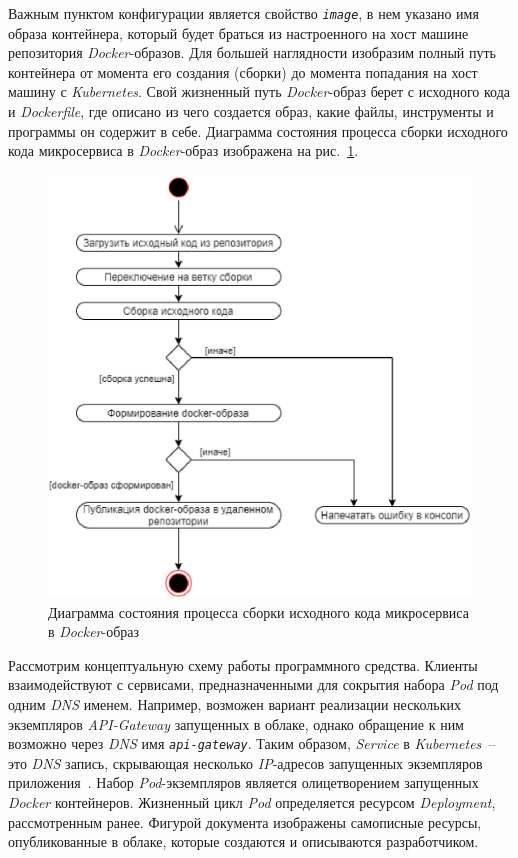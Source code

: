 Важным пунктом конфигурации является свойство \textit{\lstinline!image!}, в нем указано имя образа контейнера, который будет браться из настроенного на хост машине репозитория \textit{Docker}-образов. Для большей наглядности изобразим полный путь контейнера от момента его создания (сборки) до момента попадания на хост машину с \textit{Kubernetes}. Свой жизненный путь \textit{Docker}-образ берет с исходного кода и \textit{Dockerfile}, где описано из чего создается образ, какие файлы, инструменты и программы он содержит в себе. Диаграмма состояния процесса сборки исходного кода микросервиса в \textit{Docker}-образ изображена на рис.~\ref{fig:docker-image-flow}.

\begin{figure}[h]
\centering
    \includegraphics[width=0.75\linewidth]{assets/docker-image-flow.png}
    \caption{Диаграмма состояния процесса сборки исходного кода микросервиса в \textit{Docker}-образ}
    \label{fig:docker-image-flow}
\end{figure}

Рассмотрим концептуальную схему работы программного средства. Клиенты взаимодействуют с сервисами, предназначенными для сокрытия набора \textit{Pod} под одним \textit{DNS} именем. Например, возможен вариант реализации нескольких экземпляров \textit{API-Gateway} запущенных в облаке, однако обращение к ним возможно через \textit{DNS} имя \textit{\lstinline!api-gateway!}. Таким образом, \textit{Service} в \textit{Kubernetes}~-- это \textit{DNS} запись, скрывающая несколько \textit{IP}-адресов запущенных экземпляров приложения~\cite{book_production_kubernetes}. Набор \textit{Pod}-экземпляров является олицетворением запущенных \textit{Docker} контейнеров. Жизненный цикл \textit{Pod} определяется ресурсом \textit{Deployment}, рассмотренным ранее. Фигурой документа изображены самописные ресурсы, опубликованные в облаке, которые создаются и описываются разработчиком.

